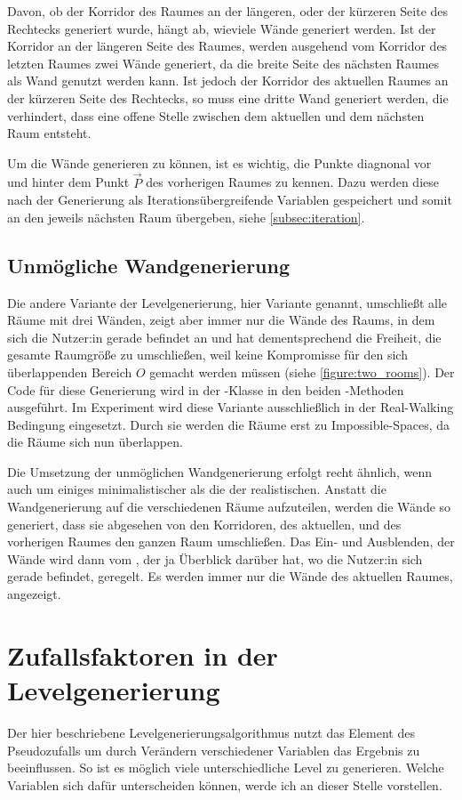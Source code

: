 Davon, ob der Korridor des Raumes an der längeren, oder der kürzeren Seite des Rechtecks generiert wurde, hängt ab, wieviele Wände generiert werden. Ist der Korridor an der längeren Seite des Raumes, werden ausgehend vom Korridor des letzten Raumes zwei Wände generiert, da die breite Seite des nächsten Raumes als Wand genutzt werden kann. Ist jedoch der Korridor des aktuellen Raumes an der kürzeren Seite des Rechtecks, so muss eine dritte Wand generiert werden, die verhindert, dass eine offene Stelle zwischen dem aktuellen und dem nächsten Raum entsteht.

Um die Wände generieren zu können, ist es wichtig, die Punkte diagnonal vor und hinter dem Punkt $\vec{P}$ des vorherigen Raumes zu kennen. Dazu werden diese nach der Generierung als Iterationsübergreifende Variablen gespeichert und somit an den jeweils nächsten Raum übergeben, siehe \autoref{subsec:iteration}.

\subsection{Unmögliche Wandgenerierung}
Die andere Variante der Levelgenerierung, hier  Variante genannt, umschließt alle Räume mit drei Wänden, zeigt aber immer nur die Wände des Raums, in dem sich die Nutzer:in gerade befindet an und hat dementsprechend die Freiheit, die gesamte Raumgröße zu umschließen, weil keine Kompromisse für den sich überlappenden Bereich $O$ gemacht werden müssen (siehe \autoref{figure:two_rooms}). Der Code für diese Generierung wird in der -Klasse in den beiden -Methoden ausgeführt. Im Experiment wird diese Variante ausschließlich in der Real-Walking Bedingung eingesetzt. Durch sie werden die Räume erst zu Impossible-Spaces, da die Räume sich nun überlappen.

Die Umsetzung der unmöglichen Wandgenerierung erfolgt recht ähnlich, wenn auch um einiges minimalistischer als die der realistischen. Anstatt die Wandgenerierung auf die verschiedenen Räume aufzuteilen, werden die Wände so generiert, dass sie abgesehen von den Korridoren, des aktuellen, und des vorherigen Raumes den ganzen Raum umschließen. Das Ein- und Ausblenden, der Wände wird dann vom , der ja Überblick darüber hat, wo die Nutzer:in sich gerade befindet, geregelt. Es werden immer nur die Wände des aktuellen Raumes, angezeigt.

\section{Zufallsfaktoren in der Levelgenerierung}
\label{sec:random}
Der hier beschriebene Levelgenerierungsalgorithmus nutzt das Element des Pseudozufalls um durch Verändern verschiedener Variablen das Ergebnis zu beeinflussen. So ist es möglich viele unterschiedliche Level zu generieren. Welche Variablen sich dafür unterscheiden können, werde ich an dieser Stelle vorstellen.

